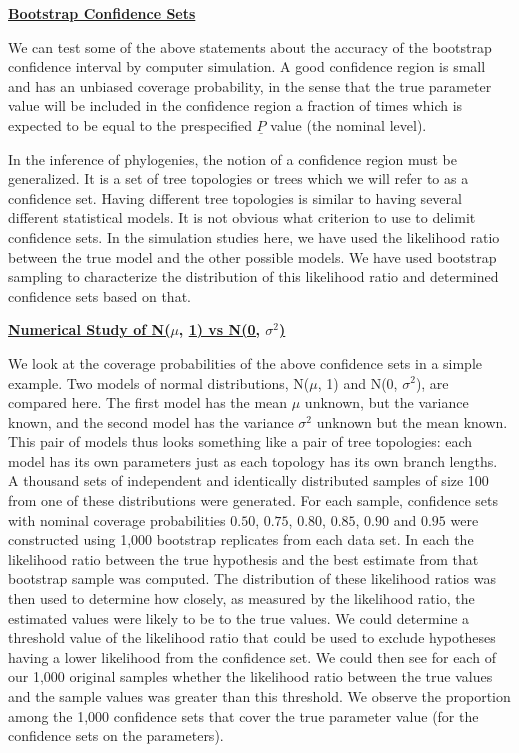 {\centerline{\underline{\bf Bootstrap Confidence Sets}}
\bigskip

We can test some of the above statements about the accuracy of the
bootstrap confidence interval by computer simulation.  A good confidence
region is small and has an unbiased coverage probability, in the sense that
the true parameter value will be included in the confidence region
a fraction of times which is expected to be equal to the
prespecified $\underline{P}$ value (the nominal level).

In the inference of phylogenies, the notion of a confidence region must be
generalized.  It is a set of tree topologies or trees which we will refer to
as a confidence set.  Having different tree topologies is similar to having
several different statistical models.  It is not obvious what criterion to
use to delimit confidence sets.  In the simulation studies here, we have used
the likelihood ratio between the true model and the other possible models.  We
have used bootstrap sampling to characterize the distribution of this
likelihood ratio and determined confidence sets based on that.
\bigskip

\centerline{\bf \underline{Numerical Study of N(}$\mu$, \underline{1) vs N(0,} $\sigma^2$\underline{{)}}}
\bigskip

We look at the coverage probabilities of the above confidence sets
in a simple example.  Two models of normal distributions,
N($\mu$, 1) and N(0, $\sigma^2$), are compared here.  The first model has
the mean $\mu$ unknown, but the variance known, and the
second model has the variance $\sigma^2$ unknown but the mean known.  This
pair of models thus looks something like a pair of tree topologies: each
model has its own parameters just as each topology has its own branch lengths.
A thousand sets of independent and identically distributed samples of size 100 from one of these
distributions were generated.  For each sample,
confidence sets with nominal coverage probabilities $0.50$, $0.75$, $0.80$,
$0.85$, $0.90$ and $0.95$ were constructed using 1,000 bootstrap replicates
from each data set.  In each the likelihood
ratio between the true hypothesis and the best estimate from that bootstrap
sample was computed.  The distribution of these likelihood ratios was
then used to determine how closely, as measured by the likelihood ratio,
the estimated values were likely to be to the true values.  We could
determine a threshold value of the likelihood ratio that could be used to
exclude hypotheses having a lower likelihood from the confidence set.
We could then
see for each of our 1,000 original samples whether the likelihood ratio
between the true values and the sample values was greater than this threshold.
We observe the proportion among the 1,000 confidence sets
that cover the true parameter value (for the confidence sets on the parameters).

}
